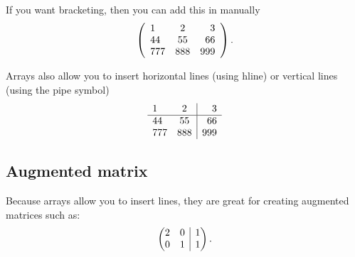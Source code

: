\documentclass[a4paper,11pt]{article}
\begin{document}
If you want bracketing, then you can add this in manually
\[ 
\left(
\begin{array}{l c r}
 1   & 2   & 3\\  
 44  & 55  & 66\\
 777 & 888 & 999  
\end{array}
\right).
\]

Arrays also allow you to insert horizontal lines (using hline) or vertical lines (using the pipe symbol) 
\[
\begin{array}{l c | r} %
 1   & 2   & 3\\  
 \hline            %
 44  & 55  & 66\\
 777 & 888 & 999  
\end{array}
\]


\subsection{Augmented matrix}

Because arrays allow you to insert lines, they are great for creating augmented matrices such as:
\[
\left(\begin{array}{@{}cc|c@{}}  %
 2 & 0 & 1\\  
 0 & 1 & 1  
\end{array}\right).
\]
\end{document}
